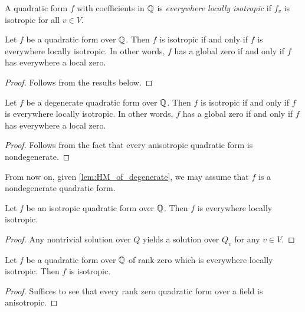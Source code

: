 \begin{definition}\label{def:everywhere_locally_isotropic}
\leanok
A quadratic form $f$ with coefficients in $\mathbb{Q}$ is \emph{everywhere locally isotropic} if $f_v$ is isotropic for all $v \in V$.
\end{definition}

\begin{theorem}\label{thm:Hasse-Minkowski}
\leanok
Let $f$ be a quadratic form over $\mathbb{Q}$. Then $f$ is isotropic if and only if $f$ is everywhere locally isotropic. In other words, $f$ has a global zero if and only if $f$ has everywhere a local zero.
\end{theorem}
\begin{proof}
Follows from the results below.
\end{proof}

\begin{theorem}\label{lem:HM_of_degenerate}
	\leanok
	Let $f$ be a degenerate quadratic form over $\mathbb{Q}$. Then $f$ is isotropic if and only if $f$ is everywhere locally isotropic. In other words, $f$ has a global zero if and only if $f$ has everywhere a local zero.
\end{theorem}
\begin{proof}
\leanok
Follows from the fact that every anisotropic quadratic form is nondegenerate.
\end{proof}

From now on, given \ref{lem:HM_of_degenerate}, we may assume that $f$ is a nondegenerate quadratic form.

\begin{lemma}\label{lem:ev_loc_isotr_of_isotr}
\leanok
Let $f$ be an isotropic quadratic form over $\mathbb{Q}$. Then $f$ is everywhere locally isotropic.
\end{lemma}
\begin{proof}
\leanok
Any nontrivial solution over $Q$ yields a solution over $Q_v$ for any $v \in V$.
\end{proof}

\begin{lemma}\label{lem:isotr_of_rk_zero}
	\leanok
	Let $f$ be a quadratic form over $\mathbb{Q}$ of rank zero which is everywhere locally isotropic. Then $f$ is isotropic.
\end{lemma}
\begin{proof}
\leanok
Suffices to see that every rank zero quadratic form over a field is anisotropic.
\end{proof}

